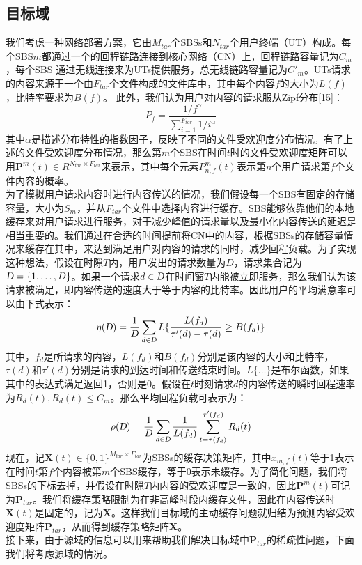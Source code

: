 \documentclass[bachelor]{seuthesis} %
\begin{document}
\begin{Main}
\subsection{目标域}
我们考虑一种网络部署方案，它由$M_{tar}$个SBSs和$N_{tar}$个用户终端（UT）构成。每个SBS$m$都通过一个的回程链路连接到核心网络（CN）上，回程链路容量记为$C_m$，每个SBS 通过无线连接来为UTs提供服务，总无线链路容量记为$C'_m$。UTs请求的内容来源于一个由$F_{tar}$个文件构成的文件库中，其中每个内容$f$的大小为$L(f)$，比特率要求为$B(f)$。 此外，我们认为用户对内容的请求服从Zipf分布[15]：
\begin{equation}
P_f=\frac{1/f^\alpha}{\sum_{i=1}^{F_{tar}}1/i^\alpha}
\end{equation}
其中$\alpha$是描述分布特性的指数因子，反映了不同的文件受欢迎度分布情况。有了上述的文件受欢迎度分布情况，那么第$m$个SBS在时间$t$时的文件受欢迎度矩阵可以用$\textbf{P}^m(t)\in R^{N_{tar}\times F_{tar}}$来表示，其中每个元素$P_{n,f}^m(t)$表示第$n$个用户请求第$f$个文件内容的概率。\\
为了模拟用户请求内容时进行内容传送的情况，我们假设每一个SBS有固定的存储容量，大小为$S_m$，并从$F_{tar}$个文件中选择内容进行缓存。SBS能够依靠他们的本地缓存来对用户请求进行服务，对于减少峰值的请求量以及最小化内容传送的延迟是相当重要的。我们通过在合适的时间提前将CN中的内容，根据SBSs的存储容量情况来缓存在其中，来达到满足用户对内容的请求的同时，减少回程负载。为了实现这种想法，假设在时隙$T$内，用户发出的请求数量为$D$，请求集合记为$\textsl{D}=\{1,\dots,D\}$。如果一个请求$d\in\textsl{D}$在时间窗$T$内能被立即服务，那么我们认为该请求被满足，即内容传送的速度大于等于内容的比特率。因此用户的平均满意率可以由下式表示：
\begin{equation}
\eta(\textsl{D})=\frac{1}{D}\sum_{d\in\textsl{D}}L\{\frac{L(f_d)}{\tau'(d)-\tau(d)}\geq B(f_d)\}
\end{equation}
其中，$f_d$是所请求的内容，$L(f_d)$和$B(f_d)$分别是该内容的大小和比特率，$\tau(d)$和$\tau'(d)$分别是请求的到达时间和传送结束时间。$L\{\dots\}$是布尔函数，如果其中的表达式满足返回1，否则是0。假设在$t$时刻请求$d$的内容传送的瞬时回程速率为$R_d(t),R_d(t)\leq C_m$。那么平均回程负载可表示为：
\begin{equation}
\rho(\textsl{D})=\frac{1}{D}\sum_{d\in\textsl{D}}\frac{1}{L(f_d)}\sum_{t=\tau(f_d)}^{\tau'(f_d)}R_d(t)
\end{equation}
现在，记$\textbf{X}(t)\in\{0,1\}^{M_{tar}\times F_{tar}}$为SBSs的缓存决策矩阵，其中$x_{m,f}(t)$等于1表示在时间$t$第$f$个内容被第$m$个SBS缓存，等于0表示未缓存。为了简化问题，我们将SBSs的下标去掉，并假设在时隙$T$内内容的受欢迎度是一致的，因此$\textbf{P}^m(t)$可记为$\textbf{P}_{tar}$。我们将缓存策略限制为在非高峰时段内缓存文件，因此在内容传送时$\textbf{X}(t)$是固定的，记为$\textbf{X}$。这样我们目标域的主动缓存问题就归结为预测内容受欢迎度矩阵$\textbf{P}_{tar}$，从而得到缓存策略矩阵$\textbf{X}$。\\
接下来，由于源域的信息可以用来帮助我们解决目标域中$\textbf{P}_{tar}$的稀疏性问题，下面我们将考虑源域的情况。

\end{Main}
\end{document}
